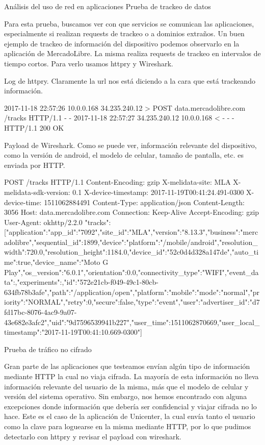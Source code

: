 Análisis del uso de red en aplicaciones
Prueba de trackeo de datos

Para esta prueba, buscamos ver con que servicios se comunican las aplicaciones, especialmente si realizan requests de trackeo o a dominios extraños. 
Un buen ejemplo de trackeo de información del dispositivo podemos observarlo en la aplicación de MercadoLibre. La misma realiza requests de trackeo en intervalos de tiempo cortos. Para verlo usamos httpry y Wireshark.

Log de httpry. Claramente la url nos está diciendo a la cara que está trackeando información.

2017-11-18 22:57:26	10.0.0.168	34.235.240.12	>	POST	data.mercadolibre.com	/tracks	HTTP/1.1	-	-
2017-11-18 22:57:27	34.235.240.12	10.0.0.168	<	-	-	-	HTTP/1.1	200	OK

Payload de Wireshark. Como se puede ver, información relevante del dispositivo, como la versión de android, el modelo de celular, tamaño de pantalla, etc. es enviada por HTTP.

	POST /tracks HTTP/1.1
Content-Encoding: gzip
X-melidata-site: MLA
X-melidata-sdk-version: 0.1
X-device-timestamp: 2017-11-19T00:41:24.491-0300
X-device-time: 1511062884491
Content-Type: application/json
Content-Length: 3056
Host: data.mercadolibre.com
Connection: Keep-Alive
Accept-Encoding: gzip
User-Agent: okhttp/2.2.0	"tracks":[{"application":{"app_id":"7092","site_id":"MLA","version":"8.13.3","business":"mercadolibre"},"sequential_id":1899,"device":{"platform":"/mobile/android","resolution_width":720.0,"resolution_height":1184.0,"device_id":"52c0d4d328a147de","auto_time":true,"device_name":"Moto G Play","os_version":"6.0.1","orientation":0.0,"connectivity_type":"WIFI"},"event_data":{},"experiments":{},"id":"572e21cb-f049-49c1-80cb-634fb78b3afe","path":"/application/open","platform":{"mobile":{"mode":"normal"}},"priority":"NORMAL","retry":0,"secure":false,"type":"event","user":{"advertiser_id":"d7fd17bc-8076-4ac9-9a07-43e682e3afc2","uid":"9d7596539941b227"},"user_time":1511062870669,"user_local_timestamp":"2017-11-19T00:41:10.669-0300"}]

Prueba de tráfico no cifrado

Gran parte de las aplicaciones que testeamos envían algún tipo de información mediante HTTP la cual no viaja cifrada. La mayoría de esta información no lleva información relevante del usuario de la misma, más que el modelo de celular y versión del sistema operativo. Sin embargo, nos hemos encontrado con alguna excepciones donde información que debería ser confidencial y viajar cifrada no lo hace. Este es el caso de la aplicación de Unicenter, la cual envía tanto el usuario como la clave para loguearse en la misma mediante HTTP, por lo que pudimos detectarlo con httpry y revisar el payload con wireshark. 

